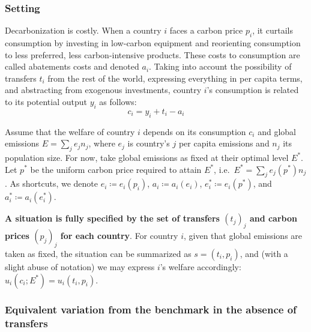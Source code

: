 \documentclass[12pt,english]{article}
\begin{document}
\subsubsection*{Setting}\label{setting}

Decarbonization is costly. When a country $i$ faces a carbon price $p_i$, it curtails consumption by investing in low-carbon equipment and reorienting consumption to less preferred, less carbon-intensive products. These costs to consumption are called abatements costs and denoted $a_i$. Taking into account the possibility of transfers $t_i$ from the rest of the world, expressing everything in per capita terms, and abstracting from exogenous investments, country $i$'s consumption is related to its potential output $y_i$ as follows:
$$c_i = y_i + t_i - a_i$$

Assume that the welfare of country $i$  depends on its consumption $c_i$ and global emissions $E=\sum_j e_j n_j$, where $e_j$ is country's $j$ per capita emissions and $n_j$ its population size.
For now, take global emissions as fixed at their optimal level $E^*$. Let $p^*$ be the uniform carbon price required to attain $E^*$, i.e.~$E^*=\sum_j e_j(p^*) n_j$. As shortcuts, we denote $e_i \coloneqq e_i(p_i)$, $a_i \coloneqq a_i(e_i)$, $e^*_i \coloneqq e_i(p^*) $, and $a^*_i \coloneqq a_i(e^*_i)$.

\textbf{A situation is fully specified by the set of transfers $(t_j)_j$ and carbon prices $(p_j)_j$ for each country}. For country $i$, given that global emissions are taken as fixed, the situation can be summarized as $s=(t_i, p_i)$, and (with a slight abuse of notation) we may express $i$'s welfare accordingly:
$u_i(c_i;E^*)=u_i(t_i,p_i)$.

\subsubsection*{Equivalent variation from the benchmark in the absence of
transfers}\label{equivalent-variation-from-the-benchmark-in-the-absence-of-transfers}
\end{document}
